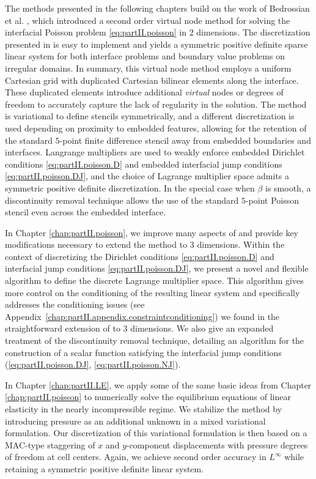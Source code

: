 The methods presented in the following chapters build on the work of Bedrossian et al. \cite{Bedrossian10}, which introduced a second order virtual node method for solving the interfacial Poisson problem \eqref{eq:partII.poisson} in $2$ dimensions. The discretization presented in \cite{Bedrossian10} is easy to implement and yields a symmetric positive definite sparse linear system for both interface problems and boundary value problems on irregular domains. In summary, this virtual node method employs a uniform Cartesian grid with duplicated Cartesian bilinear elements along the interface. These duplicated elements introduce additional \emph{virtual} nodes or degrees of freedom to accurately capture the lack of regularity in the solution. The method is variational to define stencils symmetrically, and a different discretization is used depending on proximity to embedded features, allowing for the retention of the standard $5$-point finite difference stencil away from embedded boundaries and interfaces. Langrange multipliers are used to weakly enforce embedded Dirichlet conditions \eqref{eq:partII.poisson.D} and embedded interfacial jump conditions \eqref{eq:partII.poisson.DJ}, and the choice of Lagrange multiplier space admits a symmetric positive definite discretization. In the special case when $\beta$ is smooth, a discontinuity removal technique allows the use of the standard $5$-point Poisson stencil even across the embedded interface.

In Chapter \ref{chap:partII.poisson}, we improve many aspects of \cite{Bedrossian10} and provide key modifications necessary to extend the method to $3$ dimensions. Within the context of discretizing the Dirichlet conditions \eqref{eq:partII.poisson.D} and interfacial jump conditions \eqref{eq:partII.poisson.DJ}, we present a novel and flexible algorithm to define the discrete Lagrange multiplier space. This algorithm gives more control on the conditioning of the resulting linear system and specifically addresses the conditioning issues (see Appendix~\ref{chap:partII.appendix.constraintconditioning}) we found in the straightforward extension of \cite{Bedrossian10} to $3$ dimensions. We also give an expanded treatment of the discontinuity removal technique, detailing an algorithm for the construction of a scalar function satisfying the interfacial jump conditions (\ref{eq:partII.poisson.DJ}, \ref{eq:partII.poisson.NJ}).

In Chapter \ref{chap:partII.LE}, we apply some of the same basic ideas from Chapter \ref{chap:partII.poisson} to numerically solve the equilibrium equations of linear elasticity in the nearly incompressible regime. We stabilize the method by introducing pressure as an additional unknown in a mixed variational formulation. Our discretization of this variational formulation is then based on a MAC-type staggering of $x$ and $y$-component displacements with pressure degrees of freedom at cell centers. Again, we achieve second order accuracy in $L^{\infty}$ while retaining a symmetric positive definite linear system.


